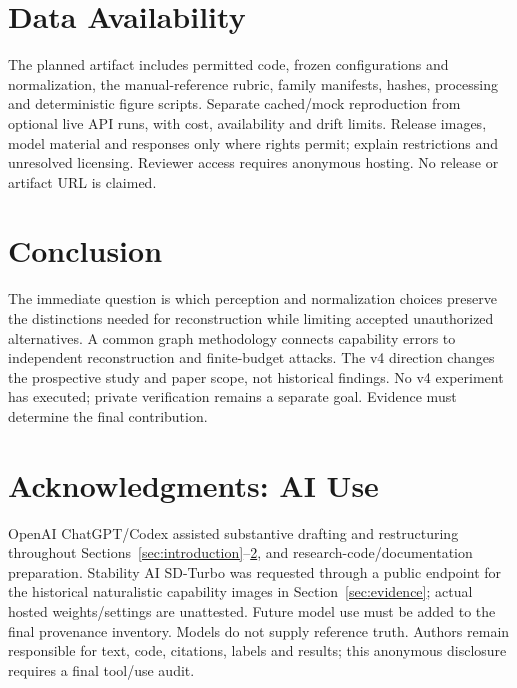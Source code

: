 \documentclass[compsoc,conference,a4paper,10pt,times]{IEEEtran}
\begin{document}
\section{Data Availability}
\label{sec:availability}
The planned artifact includes permitted code, frozen configurations and normalization, the manual-reference rubric, family manifests, hashes, processing and deterministic figure scripts. Separate cached/mock reproduction from optional live API runs, with cost, availability and drift limits. Release images, model material and responses only where rights permit; explain restrictions and unresolved licensing. Reviewer access requires anonymous hosting. No release or artifact URL is claimed.

\section{Conclusion}
\label{sec:conclusion}
The immediate question is which perception and normalization choices preserve the distinctions needed for reconstruction while limiting accepted unauthorized alternatives. A common graph methodology connects capability errors to independent reconstruction and finite-budget attacks. The v4 direction changes the prospective study and paper scope, not historical findings. No v4 experiment has executed; private verification remains a separate goal. Evidence must determine the final contribution.
\label{sec:body-end}

\section*{Acknowledgments: AI Use}
OpenAI ChatGPT/Codex assisted substantive drafting and restructuring throughout Sections~\ref{sec:introduction}--\ref{sec:conclusion}, and research-code/documentation preparation. Stability AI SD-Turbo was requested through a public endpoint for the historical naturalistic capability images in Section~\ref{sec:evidence}; actual hosted weights/settings are unattested. Future model use must be added to the final provenance inventory. Models do not supply reference truth. Authors remain responsible for text, code, citations, labels and results; this anonymous disclosure requires a final tool/use audit.



\end{document}
